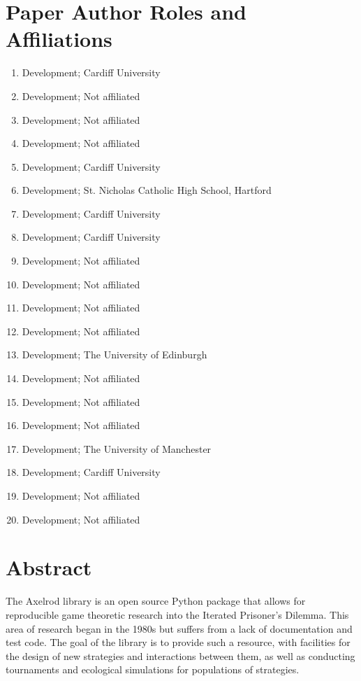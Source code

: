 \documentclass{jors}
\begin{document}
\section*{Paper Author Roles and Affiliations}


\begin{multicols}{2}
    \begin{enumerate}[noitemsep,topsep=0pt]
\item Development; Cardiff University
\item Development; Not affiliated
\item Development; Not affiliated
\item Development; Not affiliated
\item Development; Cardiff University
\item Development; St. Nicholas Catholic High School, Hartford
\item Development; Cardiff University
\item Development; Cardiff University
\item Development; Not affiliated
\item Development; Not affiliated
\item Development; Not affiliated
\item Development; Not affiliated
\item Development; The University of Edinburgh
\item Development; Not affiliated
\item Development; Not affiliated
\item Development; Not affiliated
\item Development; The University of Manchester
\item Development; Cardiff University
\item Development; Not affiliated
\item Development; Not affiliated
    \end{enumerate}
\end{multicols}

\section*{Abstract}

The Axelrod library is an open source Python package that allows for
reproducible game theoretic research into the Iterated Prisoner's Dilemma.
This area of research began in the 1980s but suffers from a lack of
documentation and test code. The goal of the library is to provide such
a resource, with facilities for the design of new strategies and
interactions between them, as well as conducting tournaments and ecological
simulations for populations of strategies.
\end{document}
